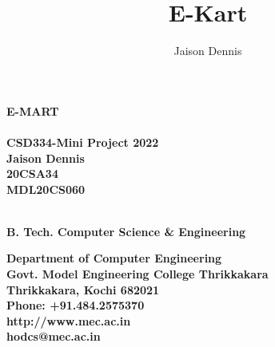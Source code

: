 \documentclass[11pt]{report}
\begin{document}
\renewcommand\bibname{References}
\pagestyle{fancy}
\fancyfoot{}
\fancyfoot[c]{\thepage}
\renewcommand{\chaptermark}[1]{
\markboth{\thechapter.\ #1}{}} 
\renewcommand{\headrulewidth}{0.1pt}
\fancyhead[r]{\slshape \leftmark}
\addtolength{\headheight}{\baselineskip}

\lhead{\nouppercase{\rightmark}}
\rhead{\nouppercase{\leftmark}}
%
\title {E-Kart}
\author {Jaison Dennis}

\begin{titlepage}
\begin{center}

\Huge{\textbf{E-MART}}\\
\large{\textbf{\\CSD334-Mini Project 2022\\}}
\vspace{1.2in}
\Large{\textbf{Jaison Dennis}}\\ 
\Large{\textbf{20CSA34\\
MDL20CS060\\
}}	\hspace{.1in}	

\Large{\textbf{
\\B. Tech. Computer Science \& Engineering
}}


\vspace{.6in}
\begin{figure}[h]
\begin{center}
\end{center}
\end{figure}
\textbf{
Department of Computer Engineering\\
Govt. Model Engineering College Thrikkakara\\
Thrikkakara, Kochi 682021\\
Phone: +91.484.2575370\\
http://www.mec.ac.in \\
hodcs@mec.ac.in
}
\end{center}
\end{titlepage}
\end{document}
